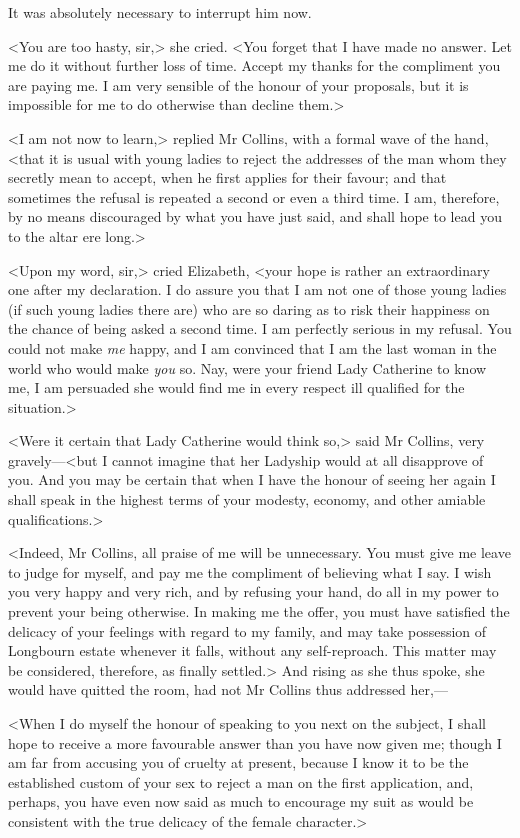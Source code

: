 It was absolutely necessary to interrupt him now.

<You are too hasty, sir,> she cried. <You forget that I have made no answer. Let me do it without further loss of time. Accept my thanks for the compliment you are paying me. I am very sensible of the honour of your proposals, but it is impossible for me to do otherwise than decline them.>

<I am not now to learn,> replied Mr Collins, with a formal wave of the hand, <that it is usual with young ladies to reject the addresses of the man whom they secretly mean to accept, when he first applies for their favour; and that sometimes the refusal is repeated a second or even a third time. I am, therefore, by no means discouraged by what you have just said, and shall hope to lead you to the altar ere long.>

<Upon my word, sir,> cried Elizabeth, <your hope is rather an extraordinary one after my declaration. I do assure you that I am not one of those young ladies (if such young ladies there are) who are so daring as to risk their happiness on the chance of being asked a second time. I am perfectly serious in my refusal. You could not make \textit{me} happy, and I am convinced that I am the last woman in the world who would make \textit{you} so. Nay, were your friend Lady Catherine to know me, I am persuaded she would find me in every respect ill qualified for the situation.>

<Were it certain that Lady Catherine would think so,> said Mr Collins, very gravely—<but I cannot imagine that her Ladyship would at all disapprove of you. And you may be certain that when I have the honour of seeing her again I shall speak in the highest terms of your modesty, economy, and other amiable qualifications.>

<Indeed, Mr Collins, all praise of me will be unnecessary. You must give me leave to judge for myself, and pay me the compliment of believing what I say. I wish you very happy and very rich, and by refusing your hand, do all in my power to prevent your being otherwise. In making me the offer, you must have satisfied the delicacy of your feelings with regard to my family, and may take possession of Longbourn estate whenever it falls, without any self-reproach. This matter may be considered, therefore, as finally settled.> And rising as she thus spoke, she would have quitted the room, had not Mr Collins thus addressed her,—

<When I do myself the honour of speaking to you next on the subject, I shall hope to receive a more favourable answer than you have now given me; though I am far from accusing you of cruelty at present, because I know it to be the established custom of your sex to reject a man on the first application, and, perhaps, you have even now said as much to encourage my suit as would be consistent with the true delicacy of the female character.>

